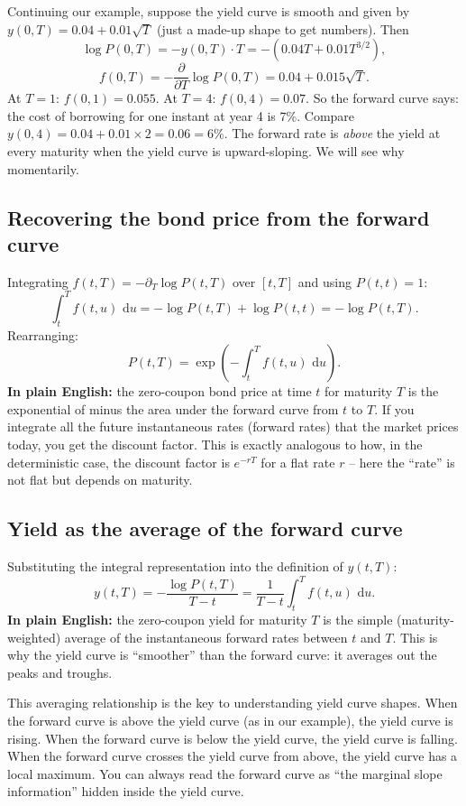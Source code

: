 \documentclass[11pt]{article}
\newcommand{\dd}{\,\mathrm{d}}
\begin{document}
\begin{example_box}
Continuing our example, suppose the yield curve is smooth and given by
$y(0,T) = 0.04 + 0.01\sqrt{T}$ (just a made-up shape to get numbers).
Then
\[
\log P(0,T) = -y(0,T)\cdot T = -(0.04T + 0.01T^{3/2}),
\]
\[
f(0,T) = -\frac{\partial}{\partial T}\log P(0,T) = 0.04 + 0.015\sqrt{T}.
\]
At $T=1$: $f(0,1)=0.055$.  At $T=4$: $f(0,4)=0.07$.  So the forward
curve says: the cost of borrowing for one instant at year 4 is $7\%$.
Compare $y(0,4) = 0.04+0.01\times 2 = 0.06 = 6\%$.  The forward rate is
\emph{above} the yield at every maturity when the yield curve is
upward-sloping.  We will see why momentarily.
\end{example_box}

\subsection{Recovering the bond price from the forward curve}

Integrating $f(t,T) = -\partial_T \log P(t,T)$ over $[t,T]$ and using
$P(t,t) = 1$:
\[
\int_t^T f(t,u)\,\dd u
= -\log P(t,T) + \log P(t,t) = -\log P(t,T).
\]
Rearranging:
\[
\boxed{P(t,T) = \exp\!\left(-\int_t^T f(t,u)\,\dd u\right).}
\]
\textbf{In plain English:} the zero-coupon bond price at time $t$ for
maturity $T$ is the exponential of minus the area under the forward curve
from $t$ to $T$.  If you integrate all the future instantaneous rates
(forward rates) that the market prices today, you get the discount factor.
This is exactly analogous to how, in the deterministic case, the discount
factor is $e^{-rT}$ for a flat rate $r$ -- here the ``rate'' is not flat
but depends on maturity.

\subsection{Yield as the average of the forward curve}

Substituting the integral representation into the definition of $y(t,T)$:
\[
y(t,T)
= -\frac{\log P(t,T)}{T-t}
= \frac{1}{T-t}\int_t^T f(t,u)\,\dd u.
\]
\textbf{In plain English:} the zero-coupon yield for maturity $T$ is the
simple (maturity-weighted) average of the instantaneous forward rates
between $t$ and $T$.  This is why the yield curve is ``smoother'' than the
forward curve: it averages out the peaks and troughs.

\begin{intuition}
This averaging relationship is the key to understanding yield curve
shapes.  When the forward curve is above the yield curve (as in our
example), the yield curve is rising.  When the forward curve is below the
yield curve, the yield curve is falling.  When the forward curve crosses
the yield curve from above, the yield curve has a local maximum.  You can
always read the forward curve as ``the marginal slope information'' hidden
inside the yield curve.
\end{intuition}
\end{document}
